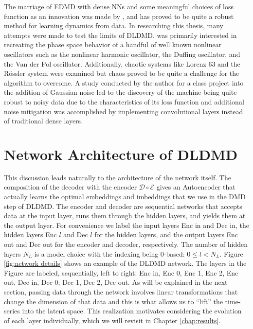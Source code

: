 The marriage of EDMD with dense NNs and some meaningful choices of loss function as 
an innovation was made by \cite{lago, brunton, lusch}, and has proved to be quite a 
robust method for learning dynamics from data. In researching this thesis, many attempts 
were made to test the limits of DLDMD. \cite{lago} was primarily interested in recreating 
the phase space behavior of a handful of well known nonlinear oscillators such as the 
nonlinear harmonic oscillator, the Duffing oscillator, and the Van der Pol oscillator. 
Additionally, chaotic systems like Lorenz 63 and the R\"{o}ssler system were examined but 
chaos proved to be quite a challenge for the algorithm to overcome. A study conducted by the
author for a class project into the addition
of Gaussian noise led to the discovery of the machine being quite robust to noisy data due to the 
characteristics of its loss function and additional noise mitigation was accomplished by 
implementing convolutional layers instead of traditional dense layers.

\section{Network Architecture of DLDMD}
This discussion leads naturally to the architecture of the network itself. The composition
of the decoder with the encoder $\mathcal{D} \circ \mathcal{E}$ gives an Autoencoder \cite{kramer}
that actually learns the optimal embeddings and imbeddings that we use in the DMD step of DLDMD.
The encoder and decoder are sequential networks that accepts data at the input layer, runs them 
through the hidden layers, and yields them at the output layer. For convenience we label the input
layers Enc in and Dec in, the hidden layers Enc $l$ and Dec $l$ for the hidden layers, and the 
output layers Enc out and Dec out for the encoder and decoder, respectively. The number of hidden 
layers $N_L$ is a model choice with the indexing being 0-based: $0 \leq l < N_L$. Figure 
\ref{fig:network details} shows an example of the DLDMD network. The layers in the Figure are 
labeled, sequentially, left to right: Enc in, Enc 0, Enc 1, Enc 2, Enc out, Dec in, Dec 0, Dec 1,
Dec 2, Dec out. As will be explained in the next
section, passing data through the network involves linear transformations that change the dimension
of that data and this is what allows us to ``lift'' the time-series into the latent space. This 
realization motivates considering the evolution of each layer individually, which we will revisit in 
Chapter \ref{chap:results}.

